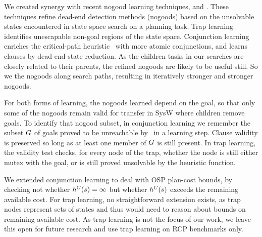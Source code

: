 We created synergy with recent nogood learning techniques,
 \cite{steinmetz:hoffmann:ai-17} and
 \cite{steinmetz:hoffmann:ijcai-17}. These
techniques refine dead-end detection methods (nogoods) based on the
unsolvable states encountered in state space search on a planning
task. Trap learning identifies unescapable non-goal regions of the
state space. Conjunction learning enriches the critical-path heuristic
\hc\ with more atomic conjunctions, and learns clauses by
dead-end-state reduction. As the children tasks in our searches are
closely related to their parents, the refined nogoods are likely to be
useful still. So we  the nogoods along search paths,
resulting in iteratively stronger and stronger nogoods.

For both forms of learning, the nogoods learned depend on the goal, so
that only some of the nogoods remain valid for transfer in SysW where
children remove goals. To identify that nogood subset, in conjunction
learning we remember the subset $G$ of goals proved to be
unreachable by \hc\ in a learning step. Clause validity is preserved
so long as at least one member of $G$ is still present. In trap
learning, the validity test checks, for every node of the trap,
whether the node is still either mutex with the goal, or is still
proved unsolvable by the heuristic function.

We extended conjunction learning to deal with OSP plan-cost bounds, by
checking not whether $h^C(s)=\infty$ but whether $h^C(s)$ exceeds the
remaining available cost. 
%
%
For trap learning, no straightforward extension exists, as trap nodes
represent sets of states and thus would need to reason about bounds on
remaining available cost. As trap learning is not the focus of our
work, we leave this open for future research and use trap learning on
RCP benchmarks only.

